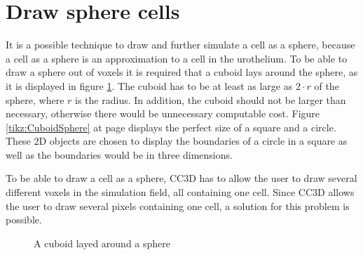 \section{Draw sphere cells}\label{sec:DrawSphereCells}
It is a possible technique to draw and further simulate a cell as a sphere, because a cell as a sphere is an approximation to a cell in the urothelium.  \newline 
To be able to draw a sphere out of voxels it is required that a cuboid lays around the sphere, as it is displayed in figure \ref{tikz:SphereInCube}. The cuboid has to be at least as large as $2 \cdot r$ of the sphere, where $r$ is the radius. In addition, the cuboid should not be larger than necessary, otherwise there would be unnecessary computable cost. Figure \ref{tikz:CuboidSphere} at page \pageref{tikz:CuboidSphere} displays the perfect size of a square and a circle. These 2D objects are chosen to display the boundaries of a circle in a square as well as the boundaries would be in three dimensions.


To be able to draw a cell as a sphere, \ac{CC3D} has to allow the user to draw several different voxels in the simulation field, all containing one cell. Since \ac{CC3D} allows the user to draw several pixels containing one cell, a solution for this problem is possible.


\begin{figure}[ht]
\begin{center}
\caption[A cuboid layed around a sphere]{A cuboid layed around a sphere}
\label{tikz:SphereInCube}
\end{center}
\end{figure}


